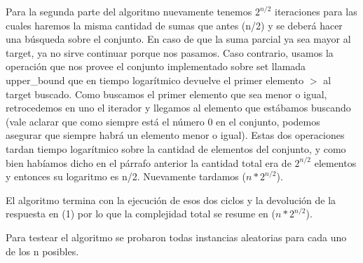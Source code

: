 Para la segunda parte del algoritmo nuevamente tenemos $2 ^{n/2}$ iteraciones para las cuales haremos la misma cantidad de sumas que antes (n/2) y se deberá hacer una búsqueda sobre el conjunto. En caso de que la suma parcial ya sea mayor al target, ya no sirve continuar porque nos pasamos. Caso contrario, usamos la operación que nos provee el conjunto implementado sobre set llamada upper_bound que en tiempo logarítmico devuelve el primer elemento $>$ al target buscado. Como buscamos el primer elemento que sea menor o igual, retrocedemos en uno el iterador y llegamos al elemento que estábamos buscando (vale aclarar que como siempre está el número 0 en el conjunto, podemos asegurar que siempre habrá un elemento menor o igual). Estas dos operaciones tardan tiempo logarítmico sobre la cantidad de elementos del conjunto, y como bien habíamos dicho en el párrafo anterior la cantidad total era de $2 ^{n/2}$ elementos y entonces su logaritmo es n/2. Nuevamente tardamos \bigo($n * 2 ^{n/2}$).

El algoritmo termina con la ejecución de esos dos ciclos y la devolución de la respuesta en \bigo(1) por lo que la complejidad total se resume en \bigo($n * 2 ^{n/2}$).

Para testear el algoritmo se probaron todas instancias aleatorias para cada uno de los n posibles.
